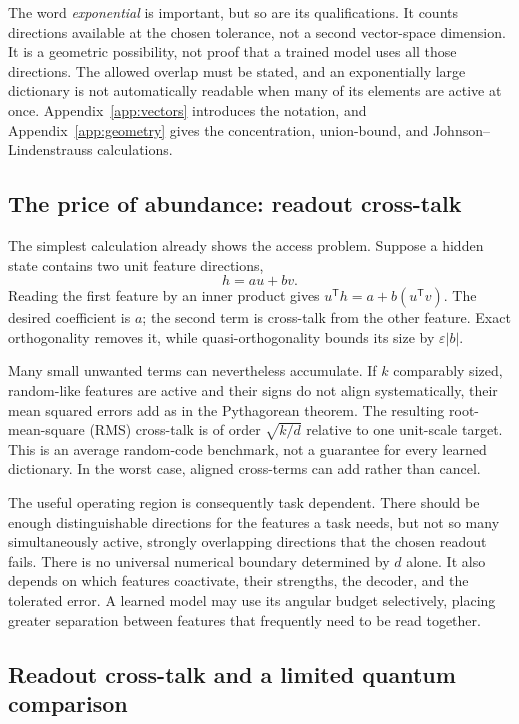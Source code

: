\documentclass[
  aps,
  reprint,
  superscriptaddress,
  floatfix,
  nofootinbib,
  longbibliography
]{revtex4-2}
\newcommand{\T}{^{\mathsf T}}
\begin{document}
The word \emph{exponential} is important, but so are its qualifications.  It
counts directions available at the chosen tolerance, not a second
vector-space dimension.  It is a geometric possibility, not proof that a
trained model uses all those directions.  The allowed overlap must be stated,
and an exponentially large dictionary is not automatically readable when
many of its elements are active at once.  Appendix~\ref{app:vectors}
introduces the notation, and Appendix~\ref{app:geometry} gives the
concentration, union-bound, and Johnson--Lindenstrauss calculations.

\subsection{The price of abundance: readout cross-talk}

The simplest calculation already shows the access problem.  Suppose a hidden
state contains two unit feature directions,
\begin{equation}
 h=a u+b v.
 \label{eq:two-feature-main}
\end{equation}
Reading the first feature by an inner product gives
$u\T h=a+b(u\T v)$.  The desired coefficient is $a$; the second term is
cross-talk from the other feature.  Exact orthogonality removes it, while
quasi-orthogonality bounds its size by $\varepsilon|b|$.

Many small unwanted terms can nevertheless accumulate.  If $k$ comparably
sized, random-like features are active and their signs do not align
systematically, their mean squared errors add as in the Pythagorean theorem.
The resulting root-mean-square (RMS) cross-talk is of order
$\sqrt{k/d}$ relative to one unit-scale target.  This is an average random-code
benchmark, not a guarantee for every learned dictionary.  In the worst case,
aligned cross-terms can add rather than cancel.

The useful operating region is consequently task dependent.  There should be
enough distinguishable directions for the features a task needs, but not so
many simultaneously active, strongly overlapping directions that the chosen
readout fails.  There is no universal numerical boundary determined by $d$
alone.  It also depends on which features coactivate, their strengths, the
decoder, and the tolerated error.  A learned model may use its angular budget
selectively, placing greater separation between features that frequently need
to be read together.

\subsection{Readout cross-talk and a limited quantum comparison}
\end{document}
